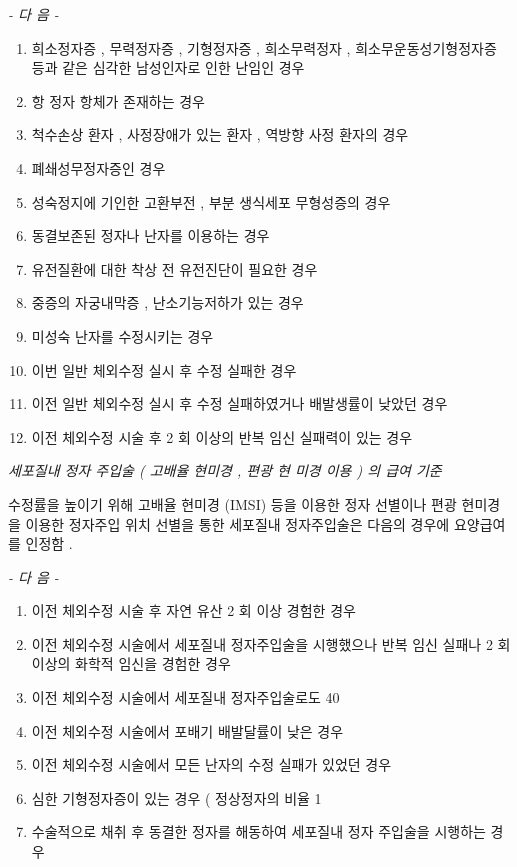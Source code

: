 \emph{-  다 음  -}\par 
\begin{enumerate}[가.]\tightlist
\item 희소정자증 ,  무력정자증 ,  기형정자증 ,  희소무력정자 ,  희소무운동성기형정자증 등과 같은 심각한 남성인자로 인한 난임인 경우 
\item 항 정자 항체가 존재하는 경우 
\item 척수손상 환자 ,  사정장애가 있는 환자 ,  역방향 사정 환자의 경우 
\item 폐쇄성무정자증인 경우  
\item 성숙정지에 기인한 고환부전 ,  부분 생식세포 무형성증의 경우 
\item 동결보존된 정자나 난자를 이용하는 경우  
\item 유전질환에 대한 착상 전 유전진단이 필요한 경우 
\item 중증의 자궁내막증 ,  난소기능저하가 있는 경우 
\item 미성숙 난자를 수정시키는 경우 
\item 이번 일반 체외수정 실시 후 수정 실패한 경우  
\item 이전 일반 체외수정 실시 후 수정 실패하였거나 배발생률이 낮았던 경우 
\item 이전 체외수정 시술 후  2 회 이상의 반복 임신 실패력이 있는 경우 
\end{enumerate} 

\emph{세포질내 정자 주입술 ( 고배율 현미경 ,  편광 현 미경 이용 ) 의  급여 기준 }\par
수정률을 높이기 위해 고배율 현미경 (IMSI)  등을 이용한 정자  선별이나 편광 현미경을 이용한 정자주입 위치 선별을 통한 세포질내 정자주입술은 다음의 경우에 요양급여를 인정함 . \par

\emph{-  다 음  -}\par 
\begin{enumerate}[가.]\tightlist
\item 이전 체외수정 시술 후 자연 유산  2 회 이상 경험한 경우 
\item 이전 체외수정 시술에서 세포질내 정자주입술을 시행했으나  반복 임신 실패나  2 회 이상의 화학적 임신을 경험한 경우 
\item 이전 체외수정 시술에서 세포질내 정자주입술로도  40%
\item 이전 체외수정 시술에서 포배기 배발달률이 낮은 경우 
\item 이전 체외수정 시술에서 모든 난자의 수정 실패가 있었던 경우 
\item 심한 기형정자증이 있는 경우 ( 정상정자의 비율  1%
\item 수술적으로 채취 후 동결한 정자를 해동하여 세포질내 정자 주입술을 시행하는 경우 
\end{enumerate} 

